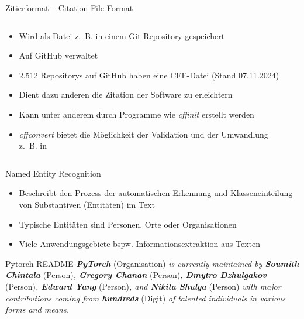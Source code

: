 \documentclass[%
    handout,
    aspectratio=1610,
    10pt,
    onlytextwidth, %
]{beamer}
\begin{document}
\begin{frame}{Zitierformat – Citation File Format}
    \begin{columns}
        \begin{column}[t]{0.49\textwidth}
            \justifying
            \begin{itemize}
                \item Wird als Datei z.~B. in einem Git-Repository gespeichert
                \item Auf GitHub \href{https://github.com/citation-file-format}{\color{black}{\faGithub}} verwaltet
                \item 2.512 Repositorys auf GitHub haben eine CFF-Datei (Stand 07.11.2024)
                \item Dient dazu anderen die Zitation der Software zu erleichtern
                \item Kann unter anderem durch Programme wie \emph{cffinit} erstellt werden \autocite{spaaks_cffinit_2023}
                \item \emph{cffconvert} bietet die Möglichkeit der Validation und der Umwandlung z.~B. in  \autocite{spaaks_cffconvert_2021}
            \end{itemize}
        \end{column}
        \begin{column}[t]{0.49\textwidth}
            \justifying
            \inputminted[fontsize=\scriptsize]{yaml}{./CITATION_small.cff}
        \end{column}
    \end{columns}
\end{frame}

\begin{frame}{Named Entity Recognition}
    \begin{itemize}
        \item Beschreibt den Prozess der automatischen Erkennung und Klasseneinteilung von Substantiven (Entitäten) im Text
        \item Typische Entitäten sind Personen, Orte oder Organisationen
        \item Viele Anwendungsgebiete bspw. Informationsextraktion aus Texten
    \end{itemize}
    \begin{exampleblock}{Pytorch README}
        \emph{\textbf{PyTorch}} (Organisation) \emph{is currently maintained by \textbf{Soumith Chintala}} (Person)\emph{, \textbf{Gregory Chanan}} (Person)\emph{, \textbf{Dmytro Dzhulgakov}} (Person)\emph{, \textbf{Edward Yang}} (Person)\emph{, and \textbf{Nikita Shulga}} (Person) \emph{with major contributions coming from \textbf{hundreds}} (Digit) \emph{of talented individuals in various forms and means.}
    \end{exampleblock}
\end{frame}
\end{document}
